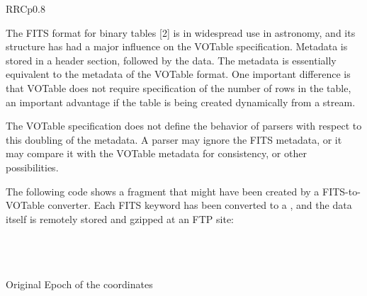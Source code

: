 \begin{tabular}{RRCp{0.8\textwidth}}
\begin{center}
{The FITS format for binary tables [2] is in widespread use in astronomy,
and its structure has had a major influence on the VOTable specification.
Metadata is stored in a header section, followed by the data. The
metadata is essentially equivalent to the metadata of the VOTable
format. One important difference is that VOTable does not require
specification of the number of rows in the table, an important
advantage if the table is being created dynamically from a stream.

The VOTable specification does not define the behavior of parsers
with respect to this doubling of the metadata. A parser may ignore
the FITS metadata, or it may compare it with the VOTable metadata for
consistency, or other possibilities.

The following code shows a fragment that might have been created
by a FITS-to-VOTable converter. Each FITS keyword has been converted
to a , and the data itself is remotely stored and gzipped at an
FTP site:

\begin{plain}\small
{}\\
\hspace*{0.5em}\\
\hspace*{0.5em}\\
        \hspace*{1em}
	Original Epoch of the coordinates\\
\hspace*{0.5em} \\
\hspace*{0.5em}\\
\hspace*{0.5em} \\
\hspace*{1.0em}\\
\hspace*{1.0em}\\
\hspace*{1.5em}\\
\hspace*{1.0em} \\
\hspace*{0.5em}\\
\end{plain}

}
\end{center}
\end{tabular}
